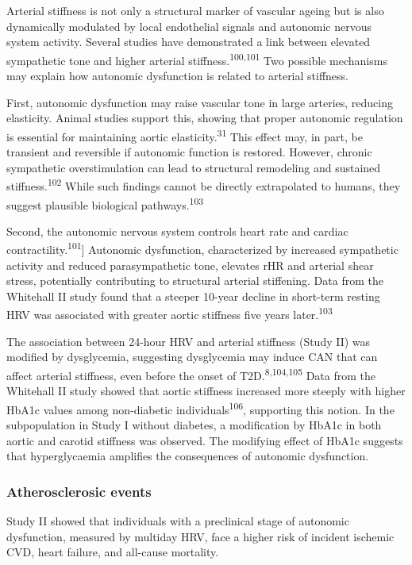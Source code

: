 \documentclass[
  a4paper,
  headsepline=true,
  open=any]{scrbook}
\begin{document}
Arterial stiffness is not only a structural marker of vascular ageing
but is also dynamically modulated by local endothelial signals and
autonomic nervous system activity. Several studies have demonstrated a
link between elevated sympathetic tone and higher arterial
stiffness.\textsuperscript{100,101} Two possible mechanisms may explain
how autonomic dysfunction is related to arterial stiffness.

First, autonomic dysfunction may raise vascular tone in large arteries,
reducing elasticity. Animal studies support this, showing that proper
autonomic regulation is essential for maintaining aortic
elasticity.\textsuperscript{31} This effect may, in part, be transient
and reversible if autonomic function is restored. However, chronic
sympathetic overstimulation can lead to structural remodeling and
sustained stiffness.\textsuperscript{102} While such findings cannot be
directly extrapolated to humans, they suggest plausible biological
pathways.\textsuperscript{103}

Second, the autonomic nervous system controls heart rate and cardiac
contractility.\textsuperscript{101}{]} Autonomic dysfunction,
characterized by increased sympathetic activity and reduced
parasympathetic tone, elevates rHR and arterial shear stress,
potentially contributing to structural arterial stiffening. Data from
the Whitehall II study found that a steeper 10-year decline in
short-term resting HRV was associated with greater aortic stiffness five
years later.\textsuperscript{103}

The association between 24-hour HRV and arterial stiffness (Study II)
was modified by dysglycemia, suggesting dysglycemia may induce CAN that
can affect arterial stiffness, even before the onset of
T2D.\textsuperscript{8,104,105} Data from the Whitehall II study showed
that aortic stiffness increased more steeply with higher HbA1c values
among non-diabetic individuals\textsuperscript{106}, supporting this
notion. In the subpopulation in Study I without diabetes, a modification
by HbA1c in both aortic and carotid stiffness was observed. The
modifying effect of HbA1c suggests that hyperglycaemia amplifies the
consequences of autonomic dysfunction.

\hypertarget{atherosclerosic-events}{%
\subsubsection{Atherosclerosic events}\label{atherosclerosic-events}}

Study II showed that individuals with a preclinical stage of autonomic
dysfunction, measured by multiday HRV, face a higher risk of incident
ischemic CVD, heart failure, and all-cause mortality.
\end{document}
